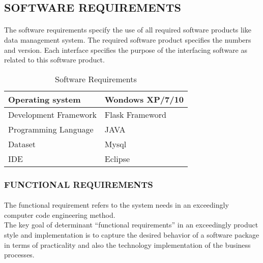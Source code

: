 
\subsection{SOFTWARE REQUIREMENTS}
\paragraph{}The software requirements specify the use of all required software products like data management system. The required software product specifies the numbers and version. Each interface specifies the purpose of the interfacing software as related to this software product.
\begin{table}[hp!]
\caption {Software Requirements}
\centering
\begin{tabular}{|p{5cm}|p{7cm}|}
\hline  Operating system 	  & Wondows XP/7/10 \\ 
\hline  Development Framework &  Flask Frameword\\
\hline  Programming Language & JAVA
\\ 
\hline  Dataset & Mysql\\
\hline  IDE & Eclipse
\\
\hline  
\end{tabular} 
\end{table}




\subsubsection{FUNCTIONAL REQUIREMENTS}
\paragraph{} The functional requirement refers to the system needs in an exceedingly computer code engineering method.\\
The key goal of determinant “functional requirements” in an exceedingly product style and implementation is to capture the desired behavior of a software package in terms of practicality and also the technology implementation of the business processes.

